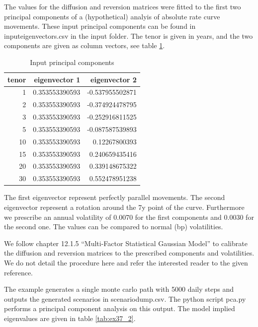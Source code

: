 The values for the diffusion and reversion matrices were fitted to the first two principal components of a
(hypothetical) analyis of absolute rate curve movements. These input principal components can be found in
inputeigenvectors.csv in the input folder. The tenor is given in years, and the two components are given as column
vectors, see table \ref{tab:ex37_1}.

\begin{table}[hbt]
\begin{center}
\begin{tabular}{r|r|r}
tenor & eigenvector 1  & eigenvector 2   \\
\hline
1     & 0.353553390593 & -0.537955502871 \\
2     & 0.353553390593 & -0.374924478795 \\
3     & 0.353553390593 & -0.252916811525 \\
5     & 0.353553390593 & -0.087587539893 \\
10    & 0.353553390593 & 0.12267800393   \\
15    & 0.353553390593 & 0.240659435416  \\
20    & 0.353553390593 & 0.339148675322  \\
30    & 0.353553390593 & 0.552478951238
\end{tabular}
\caption{Input principal components}
\label{tab:ex37_1}
\end{center}
\end{table}

The first eigenvector represent perfectly parallel movements. The second eigenvector represent a rotation around the 7y
point of the curve. Furthermore we prescribe an annual volatility of 0.0070 for the first components and 0.0030 for the
second one. The values can be compared to normal (bp) volatilities.

We follow \cite{Andersen_Piterbarg_2010} chapter 12.1.5 ``Multi-Factor Statistical Gaussian Model'' to calibrate the
diffusion and reversion matrices to the prescribed components and volatilities. We do not detail the procedure here and
refer the interested reader to the given reference.

The example generates a single monte carlo path with 5000 daily steps and outputs the generated scenarios in
scenariodump.csv. The python script pca.py performs a principal component analysis on this output. The model implied
eigenvalues are given in table \ref{tab:ex37_2}.


